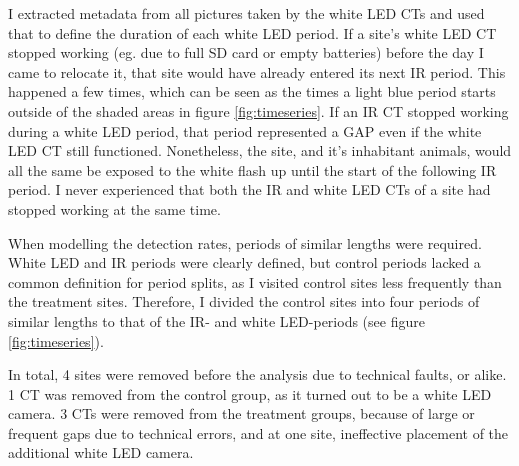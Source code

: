 I extracted metadata from all pictures taken by the white LED CTs and used that to define the duration of each white LED period.
If a site's white LED CT stopped working (eg. due to full SD card or empty batteries) before the day I came to relocate it, that site would have already entered its next IR period.
This happened a few times, %
which can be seen as the times a light blue period starts outside of the shaded areas in figure \ref{fig:timeseries}.
If an IR CT stopped working during a white LED period, that period represented a GAP even if the white LED CT still functioned. 
Nonetheless, the site, and it's inhabitant animals, would all the same be exposed to the white flash up until the start of the following IR period.
I never experienced that both the IR and white LED CTs of a site had stopped working at the same time.

When modelling the detection rates, periods of similar lengths were required.
White LED and IR periods were clearly defined, but control periods lacked a common definition for period splits, as I visited control sites less frequently than the treatment sites.
Therefore, I divided the control sites into four periods of similar lengths to that of the IR- and white LED-periods (see figure \ref{fig:timeseries}). 


In total, 4 sites were removed before the analysis due to technical faults, or alike.
1 CT was removed from the control group, as it turned out to be a white LED camera.
3 CTs were removed from the treatment groups, because of large or frequent gaps due to technical errors, and at one site, ineffective placement of the additional white LED camera. 



